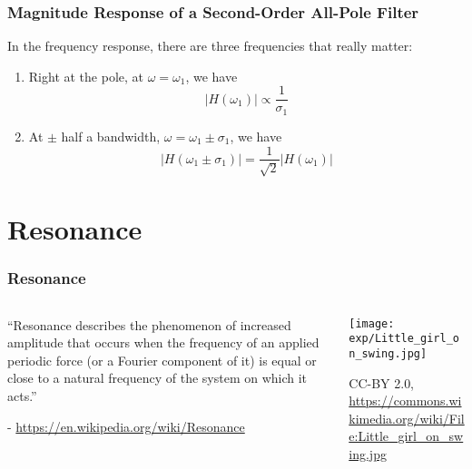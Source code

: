 \documentclass{beamer}
\begin{document}
\begin{frame}
  \frametitle{Magnitude Response of a Second-Order All-Pole Filter}

  In the frequency response, there are three frequencies that really matter:
  \begin{enumerate}
  \item Right at the pole, at $\omega=\omega_1$, we have
    \begin{displaymath}
      |H(\omega_1)| \propto \frac{1}{\sigma_1}
    \end{displaymath}
  \item At $\pm$ half a bandwidth, $\omega=\omega_1\pm\sigma_1$, we have
    \begin{displaymath}
      |H(\omega_1\pm\sigma_1)| =\frac{1}{\sqrt{2}}|H(\omega_1)|
    \end{displaymath}
  \end{enumerate}
\end{frame}  

\section[Resonance]{Resonance}
\setcounter{subsection}{1}

\begin{frame}
  \frametitle{Resonance}
  \begin{columns}
    \begin{column}{0.5\textwidth}
      ``Resonance describes the phenomenon of increased amplitude that
      occurs when the frequency of an applied periodic force (or a
      Fourier component of it) is equal or close to a natural
      frequency of the system on which it acts.''

      - \url{https://en.wikipedia.org/wiki/Resonance}
    \end{column}
    \begin{column}{0.5\textwidth}
      \begin{center}
        \texttt{[image: exp/Little\_girl\_on\_swing.jpg]}

        {\tiny CC-BY 2.0, \url{https://commons.wikimedia.org/wiki/File:Little_girl_on_swing.jpg}}
      \end{center}
    \end{column}
  \end{columns}
\end{frame}
\end{document}
